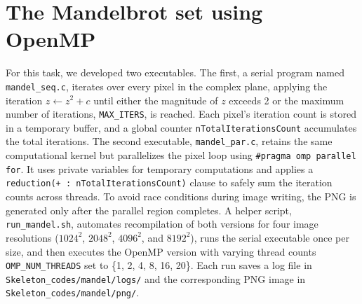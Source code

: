 \section{The Mandelbrot set using OpenMP }

For this task, we developed two executables. The first, a serial program named \texttt{mandel\_seq.c}, iterates over every pixel in the complex plane, applying the iteration $z \leftarrow z^2 + c$ until either the magnitude of $z$ exceeds 2 or the maximum number of iterations, \texttt{MAX\_ITERS}, is reached. Each pixel's iteration count is stored in a temporary buffer, and a global counter \texttt{nTotalIterationsCount} accumulates the total iterations. The second executable, \texttt{mandel\_par.c}, retains the same computational kernel but parallelizes the pixel loop using \verb|#pragma omp parallel for|. It uses private variables for temporary computations and applies a \verb|reduction(+ : nTotalIterationsCount)| clause to safely sum the iteration counts across threads. To avoid race conditions during image writing, the PNG is generated only after the parallel region completes. A helper script, \texttt{run\_mandel.sh}, automates recompilation of both versions for four image resolutions ($1024^2$, $2048^2$, $4096^2$, and $8192^2$), runs the serial executable once per size, and then executes the OpenMP version with varying thread counts \texttt{OMP\_NUM\_THREADS} set to \{1, 2, 4, 8, 16, 20\}. Each run saves a log file in \texttt{Skeleton\_codes/mandel/logs/} and the corresponding PNG image in \texttt{Skeleton\_codes/mandel/png/}. \\

